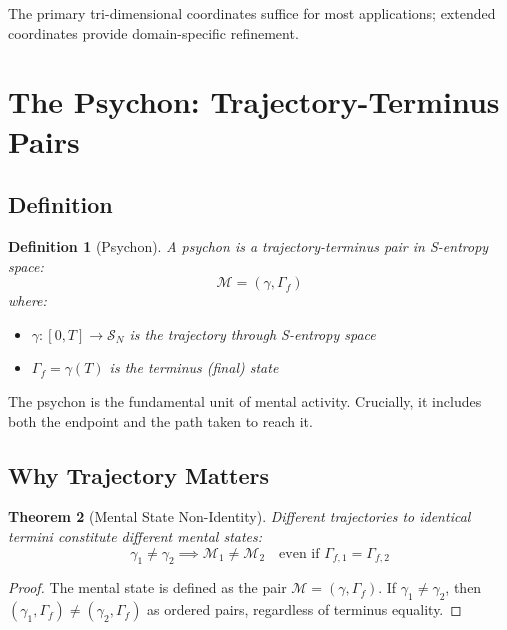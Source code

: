 \documentclass[twocolumn,amsmath,amssymb,aps,prl,superscriptaddress]{revtex4-2}
\newtheorem{theorem}{Theorem}[section]
\newtheorem{definition}[theorem]{Definition}
\newcommand{\Sspace}{\mathcal{S}}
\newcommand{\Mstate}{\mathcal{M}}
\newcommand{\Gstate}{\Gamma}
\newcommand{\traj}{\gamma}
\begin{document}
The primary tri-dimensional coordinates suffice for most applications; extended coordinates provide domain-specific refinement.

\section{The Psychon: Trajectory-Terminus Pairs}
\label{sec:psychon}

\subsection{Definition}

\begin{definition}[Psychon]
\label{def:psychon}
A psychon is a trajectory-terminus pair in S-entropy space:
\begin{equation}
\boxed{\Mstate = (\traj, \Gstate_f)}
\end{equation}
where:
\begin{itemize}
\item $\traj: [0, T] \to \Sspace_N$ is the trajectory through S-entropy space
\item $\Gstate_f = \traj(T)$ is the terminus (final) state
\end{itemize}
\end{definition}

The psychon is the fundamental unit of mental activity. Crucially, it includes both the endpoint and the path taken to reach it.

\subsection{Why Trajectory Matters}

\begin{theorem}[Mental State Non-Identity]
\label{thm:nonidentity}
Different trajectories to identical termini constitute different mental states:
\begin{equation}
\boxed{\traj_1 \neq \traj_2 \implies \Mstate_1 \neq \Mstate_2 \quad \text{even if } \Gstate_{f,1} = \Gstate_{f,2}}
\end{equation}
\end{theorem}

\begin{proof}
The mental state is defined as the pair $\Mstate = (\traj, \Gstate_f)$. If $\traj_1 \neq \traj_2$, then $(\traj_1, \Gstate_f) \neq (\traj_2, \Gstate_f)$ as ordered pairs, regardless of terminus equality.
\end{proof}
\end{document}
